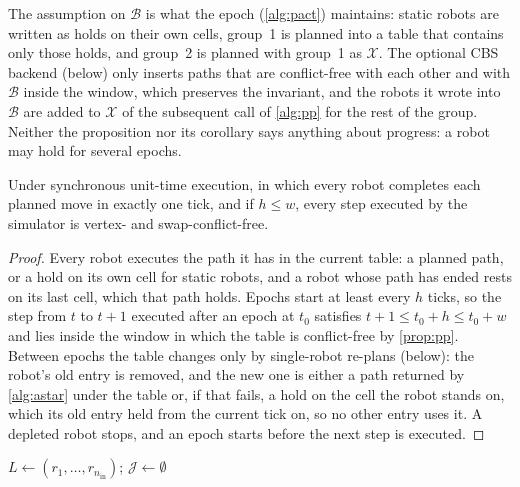 The assumption on $\mathcal{B}$ is what the epoch
(\cref{alg:pact}) maintains: static robots are written as holds on their own
cells, group~1 is planned into a table that contains only those holds, and
group~2 is planned with group~1 as $\mathcal{X}$. The optional CBS backend
(below) only inserts paths that are conflict-free with each other and with
$\mathcal{B}$ inside the window, which preserves the invariant, and the
robots it wrote into $\mathcal{B}$ are added to $\mathcal{X}$ of the
subsequent call of \cref{alg:pp} for the rest of the group. Neither the proposition nor its corollary says anything about
progress: a robot may hold for several epochs.

\begin{corollary}\label{cor:exec}
Under synchronous unit-time execution, in which every robot completes each
planned move in exactly one tick, and if $h\le w$, every step executed by the
simulator is vertex- and swap-conflict-free.
\end{corollary}
\begin{proof}
Every robot executes the path it has in the current table: a planned path,
or a hold on its own cell for static robots, and a robot whose path has ended
rests on its last cell, which that path holds. Epochs start at least every
$h$ ticks, so the step from $t$ to $t+1$ executed after an epoch at $t_0$
satisfies $t+1\le t_0+h\le t_0+w$ and lies inside the window in which the
table is conflict-free by \cref{prop:pp}. Between epochs the table changes
only by single-robot re-plans (below): the robot's old entry is removed, and
the new one is either a path returned by \cref{alg:astar} under the table or,
if that fails, a hold on the cell the robot stands on, which its old entry
held from the current tick on, so no other entry uses it. A depleted robot
stops, and an epoch starts before the next step is executed.
\end{proof}

\begin{algorithm}[t]
\caption{Prioritized planning with hold cascade}\label{alg:pp}
$L\gets(r_1,\dots,r_{n_{\mathrm{in}}})$; $\mathcal{J}\gets\emptyset$\;
\end{algorithm}

